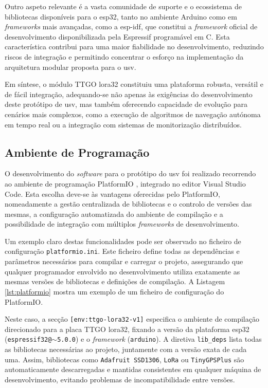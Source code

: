 Outro aspeto relevante é a vasta comunidade de suporte e o ecossistema de bibliotecas disponíveis para o \gls{esp32}, tanto no ambiente Arduino como em \emph{frameworks} mais avançadas, como a \gls{esp-idf}, que constitui a \emph{framework} oficial de desenvolvimento disponibilizada pela Espressif programável em C. Esta característica contribui para uma maior fiabilidade no desenvolvimento, reduzindo riscos de integração e permitindo concentrar o esforço na implementação da arquitetura modular proposta para o \gls{usv}.

Em síntese, o módulo TTGO \gls{lora}32 constituiu uma plataforma robusta, versátil e de fácil integração, adequando-se não apenas às exigências do desenvolvimento deste protótipo de \gls{usv}, mas também oferecendo capacidade de evolução para cenários mais complexos, como a execução de algoritmos de navegação autónoma em tempo real ou a integração com sistemas de monitorização distribuídos.

\subsection{Ambiente de Programação}
\label{subsec:ambiente-programacao}

O desenvolvimento do \emph{software} para o protótipo do \gls{usv} foi realizado recorrendo ao ambiente de programação PlatformIO \cite{platformio}, integrado no editor Visual Studio Code. Esta escolha deve-se às vantagens oferecidas pelo PlatformIO, nomeadamente a gestão centralizada de bibliotecas e o controlo de versões das mesmas, a configuração automatizada do ambiente de compilação e a possibilidade de integração com múltiplos \emph{frameworks} de desenvolvimento.

Um exemplo claro destas funcionalidades pode ser observado no ficheiro de configuração \texttt{platformio.ini}. Este ficheiro define todas as dependências e parâmetros necessários para compilar e carregar o projeto, assegurando que qualquer programador envolvido no desenvolvimento utiliza exatamente as mesmas versões de bibliotecas e definições de compilação. A Listagem \ref{lst:platformio} mostra um exemplo de um ficheiro de configuração do PlatformIO.



Neste caso, a secção \texttt{[env:ttgo-lora32-v1]} especifica o ambiente de compilação direcionado para a placa TTGO \gls{lora}32, fixando a versão da plataforma \gls{esp32} (\texttt{espressif32@$\sim$5.0.0}) e o \emph{framework} (\texttt{arduino}). A diretiva \texttt{lib\_deps} lista todas as bibliotecas necessárias ao projeto, juntamente com a versão exata de cada uma. Assim, bibliotecas como \texttt{Adafruit SSD1306}, \texttt{LoRa} ou \texttt{TinyGPSPlus} são automaticamente descarregadas e mantidas consistentes em qualquer máquina de desenvolvimento, evitando problemas de incompatibilidade entre versões.  

